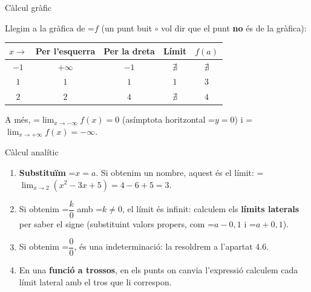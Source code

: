 \documentclass[11pt,a4paper]{article}
\newcommand{\fmm}[1]{\setbox0=\hbox{$#1$}\ifdim\wd0>\linewidth\[#1\]\else\mbox{\box0}\fi}
\begin{document}
  
\begin{fmex}{Càlcul gràfic}
\begin{center}\end{center}

      

Llegim a la gràfica de \fmm{f} (un punt buit $\circ$ vol dir que el punt \textbf{no} és de la gràfica):

      
\begin{center}\renewcommand{\arraystretch}{1.5}\begin{tabular}{ccccc}\toprule
\textbf{$x\to$} & \textbf{Per l'esquerra} & \textbf{Per la dreta} & \textbf{Límit} & \textbf{$f(a)$}\\\midrule
$-1$ & $+\infty$ & $-1$ & $\nexists$ & $\nexists$\\
$1$ & $1$ & $1$ & $1$ & $3$\\
$2$ & $2$ & $4$ & $\nexists$ & $4$\\
\bottomrule\end{tabular}\end{center}

      

A més, \fmm{\displaystyle\lim_{x\to-\infty}f(x)=0} (asímptota horitzontal \fmm{y=0}) i \fmm{\displaystyle\lim_{x\to+\infty}f(x)=-\infty}.
\end{fmex}

  
\begin{fmdef}{Càlcul analític}
\begin{enumerate}
\item \textbf{Substituïm} \fmm{x=a}. Si obtenim un nombre, aquest és el límit: \fmm{\displaystyle\lim_{x\to2}\left(x^2-3x+5\right)=4-6+5=3}.
\item Si obtenim \fmm{\dfrac{k}{0}} amb \fmm{k\neq0}, el límit és infinit: calculem els \textbf{límits laterals} per saber el signe (substituint valors propers, com \fmm{a-0{,}1} i \fmm{a+0{,}1}).
\item Si obtenim \fmm{\dfrac00}, és una indeterminació: la resoldrem a l'apartat 4.6.
\item En una \textbf{funció a trossos}, en els punts on canvia l'expressió calculem cada límit lateral amb el tros que li correspon.
\end{enumerate}
\end{fmdef}
\end{document}
